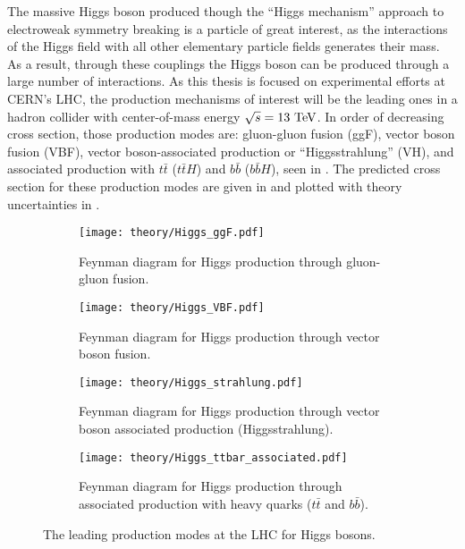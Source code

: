 The massive Higgs boson produced though the ``Higgs mechanism'' approach to electroweak symmetry breaking is a particle of great interest, as the interactions of the Higgs field with all other elementary particle fields generates their mass.
As a result, through these couplings the Higgs boson can be produced through a large number of interactions.
As this thesis is focused on experimental efforts at CERN's \gls{LHC}, the production mechanisms of interest will be the leading ones in a hadron collider with center-of-mass energy $\sqrt{s}=13~\mathrm{TeV}$.
In order of decreasing cross section, those production modes are: gluon-gluon fusion (ggF), vector boson fusion (VBF), vector boson-associated production or ``Higgsstrahlung'' (VH), and associated production with $t\bar{t}$ ($t\bar{t}H$) and $b\bar{b}$ ($b\bar{b}H$), seen in .
The predicted cross section for these production modes are given in  and plotted with theory uncertainties in .

\begin{figure}[htbp]
 \centering
 \begin{subfigure}[t]{0.48\textwidth}
  \centering
  \texttt{[image: theory/Higgs\_ggF.pdf]}
  \caption[Feynman diagram for Higgs production through gluon-gluon fusion.]{%
   Feynman diagram for Higgs production through gluon-gluon fusion.}
  \label{fig:Higgs_ggF}
 \end{subfigure}%
 \quad
 \begin{subfigure}[t]{0.48\textwidth}
  \centering
  \texttt{[image: theory/Higgs\_VBF.pdf]}
  \caption[Feynman diagram for Higgs production through vector boson fusion.]{%
   Feynman diagram for Higgs production through vector boson fusion.}
  \label{fig:Higgs_VBF}
 \end{subfigure}%

 \begin{subfigure}[t]{0.48\textwidth}
  \centering
  \texttt{[image: theory/Higgs\_strahlung.pdf]}
  \caption[Feynman diagram for Higgs production through vector boson associated production (Higgsstrahlung).]{%
   Feynman diagram for Higgs production through vector boson associated production (Higgsstrahlung).}
  \label{fig:Higgs_associated_production}
 \end{subfigure}%
 \quad
 \begin{subfigure}[t]{0.48\textwidth}
  \centering
  \texttt{[image: theory/Higgs\_ttbar\_associated.pdf]}
  \caption[Feynman diagram for Higgs production through associated production with heavy quarks ($t\bar{t}$ and $b\bar{b}$).]{%
   Feynman diagram for Higgs production through associated production with heavy quarks ($t\bar{t}$ and $b\bar{b}$).}
  \label{fig:Higgs_associated_production_ttbar}
 \end{subfigure}%
 \caption[The leading production modes at the LHC for Higgs bosons.]{%
  The leading production modes at the LHC for Higgs bosons.}
 \label{fig:Higgs_production_diagrams}
\end{figure}

